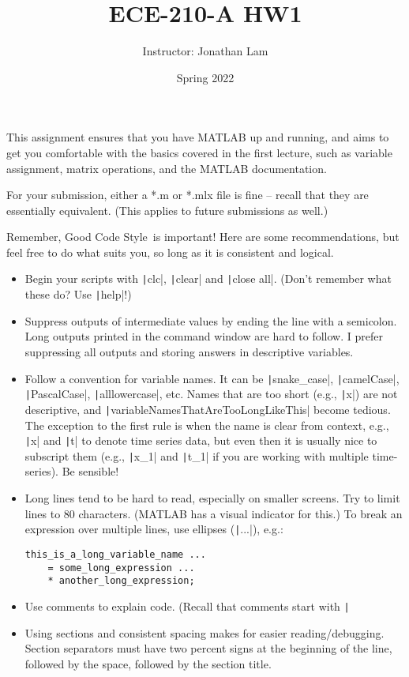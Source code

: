 \documentclass{article}
\title{ECE-210-A HW1}
\author{Instructor: Jonathan Lam}
\date{Spring 2022}
\begin{document}
\maketitle

\noindent This assignment ensures that you have MATLAB up and running, and aims to get you comfortable with the basics covered in the first lecture, such as variable assignment, matrix operations, and the MATLAB documentation.

For your submission, either a *.m or *.mlx file is fine -- recall that they are essentially equivalent. (This applies to future submissions as well.)

Remember, Good Code Style\texttrademark\ is important! Here are some recommendations, but feel free to do what suits you, so long as it is consistent and logical.
\begin{itemize}
\item Begin your scripts with \texttt|clc|, \texttt|clear| and \texttt|close all|. (Don't remember what these do? Use \texttt|help|!)
\item Suppress outputs of intermediate values by ending the line with a semicolon. Long outputs printed in the command window are hard to follow. I prefer suppressing all outputs and storing answers in descriptive variables.
\item Follow a convention for variable names. It can be \texttt|snake_case|, \texttt|camelCase|, \texttt|PascalCase|, \texttt|alllowercase|, etc. Names that are too short (e.g., \texttt|x|) are not descriptive, and \texttt|variableNamesThatAreTooLongLikeThis| become tedious. The exception to the first rule is when the name is clear from context, e.g., \texttt|x| and \texttt|t| to denote time series data, but even then it is usually nice to subscript them (e.g., \texttt|x_1| and \texttt|t_1| if you are working with multiple time-series). Be sensible!
  
\item Long lines tend to be hard to read, especially on smaller screens. Try to limit lines to 80 characters. (MATLAB has a visual indicator for this.) To break an expression over multiple lines, use ellipses (\texttt|...|), e.g.:
\begin{verbatim}
this_is_a_long_variable_name ...
	= some_long_expression ...
	* another_long_expression;
\end{verbatim}
  
\item Use comments to explain code. (Recall that comments start with \texttt|%
  
\item Using sections and consistent spacing makes for easier reading/debugging. Section separators must have two percent signs at the beginning of the line, followed by the space, followed by the section title.
\end{itemize}
\end{document}
